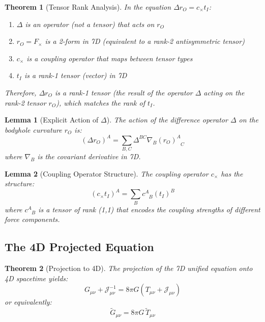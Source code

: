 \documentclass{article}
\newcommand{\tl}[1]{\tilde{#1}}
\newtheorem{theorem}{Theorem}
\newtheorem{lemma}{Lemma}
\begin{document}
\begin{theorem}[Tensor Rank Analysis]
In the equation $\Delta r_O = c_{\times} t_I$:
\begin{enumerate}
\item $\Delta$ is an operator (not a tensor) that acts on $r_O$
\item $r_O = F_{\times}$ is a 2-form in 7D (equivalent to a rank-2 antisymmetric tensor)
\item $c_{\times}$ is a coupling operator that maps between tensor types
\item $t_I$ is a rank-1 tensor (vector) in 7D
\end{enumerate}

Therefore, $\Delta r_O$ is a rank-1 tensor (the result of the operator $\Delta$ acting on the rank-2 tensor $r_O$), which matches the rank of $t_I$.
\end{theorem}

\begin{lemma}[Explicit Action of $\Delta$]
The action of the difference operator $\Delta$ on the bodyhole curvature $r_O$ is:
\begin{equation}
(\Delta r_O)^A = \sum_{B,C} \Delta^{BC} \nabla_B (r_O)^A_{\phantom{A}C}
\end{equation}
where $\nabla_B$ is the covariant derivative in 7D.
\end{lemma}

\begin{lemma}[Coupling Operator Structure]
The coupling operator $c_{\times}$ has the structure:
\begin{equation}
(c_{\times} t_I)^A = \sum_B c^A_{\phantom{A}B} (t_I)^B
\end{equation}
where $c^A_{\phantom{A}B}$ is a tensor of rank (1,1) that encodes the coupling strengths of different force components.
\end{lemma}

\subsection{The 4D Projected Equation}

\begin{theorem}[Projection to 4D]
The projection of the 7D unified equation onto 4D spacetime yields:
\begin{equation}
G_{\mu\nu} + \mathcal{J}^{-1}_{\mu\nu} = 8\pi G (T_{\mu\nu} + \mathcal{J}_{\mu\nu})
\end{equation}
or equivalently:
\begin{equation}
\tl{G}_{\mu\nu} = 8\pi G \, \tl{T}_{\mu\nu}
\end{equation}
\end{theorem}
\end{document}
